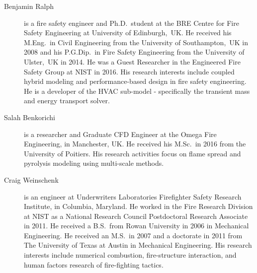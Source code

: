 \begin{description}
\item[Benjamin Ralph] is a fire safety engineer and Ph.D.~student at the BRE Centre for Fire Safety Engineering at University of Edinburgh,~UK. He received his M.Eng.~in Civil Engineering from the University of Southampton,~UK in 2008 and his P.G.Dip.~in Fire Safety Engineering from the University of Ulster,~UK in 2014. He was a Guest Researcher in the Engineered Fire Safety Group at NIST in 2016. His research interests include coupled hybrid modeling and performance-based design in fire safety engineering. He is a developer of the HVAC sub-model - specifically the transient mass and energy transport solver.

\item[Salah Benkorichi] is a researcher and Graduate CFD Engineer at the Omega Fire Engineering, in Manchester, UK. He received his M.Sc.~in 2016 from the University of Poitiers. His research activities focus on flame spread and pyrolysis modeling using multi-scale methods.

\item[Craig Weinschenk] is an engineer at Underwriters Laboratories Firefighter Safety Research Institute, in Columbia, Maryland. He worked in the Fire Research Division at NIST as a National Research Council Postdoctoral Research Associate in 2011. He received a B.S.~from Rowan University in 2006 in Mechanical Engineering. He received an M.S.~in 2007 and a doctorate in 2011 from The University of Texas at Austin in Mechanical Engineering. His research interests include numerical combustion, fire-structure interaction, and human factors research of fire-fighting tactics.

\end{description}



